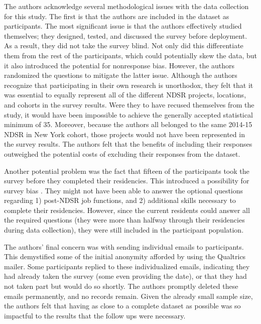 \documentclass{acm_proc_article-sp}
\begin{document}
The authors acknowledge several methodological issues with the data collection for this study. The first is that the authors are included in the dataset as participants. The most significant issue is that the authors effectively studied themselves; they designed, tested, and discussed the survey before deployment. As a result, they did not take the survey blind. Not only did this differentiate them from the rest of the participants, which could potentially skew the data, but it also introduced the potential for nonresponse bias\cite{31}. However, the authors randomized the questions to mitigate the latter issue. Although the authors recognize that participating in their own research is unorthodox, they felt that it was essential to equally represent all of the different NDSR projects, locations, and cohorts in the survey results. Were they to have recused themselves from the study, it would have been impossible to achieve the generally accepted statistical minimum of 35\cite{32}. Moreover, because the authors all belonged to the same 2014-15 NDSR in New York cohort, those projects would not have been represented in the survey results. The authors felt that the benefits of including their responses  outweighed the potential costs of excluding their responses from the dataset. 

Another potential problem was the fact that fifteen of the participants took the survey before they completed their residencies. This introduced a possibility for survey bias \cite{33}. They might not have been able to answer the optional questions regarding 1) post-NDSR job functions, and 2) additional skills necessary to complete their residencies. However, since the current residents could answer all the required questions (they were more than halfway through their residencies during data collection), they were still included in the participant population. 

The authors' final concern was with sending individual emails to participants. This demystified some of the initial anonymity afforded by using the Qualtrics mailer. Some participants replied to these individualized emails, indicating they had already taken the survey (some even providing the date), or that they had not taken part but would do so shortly. The authors promptly deleted these emails permanently, and no records remain. Given the already small sample size, the authors felt that having as close to a complete dataset as possible was so impactful to the results that the follow ups were necessary. 
\end{document}
